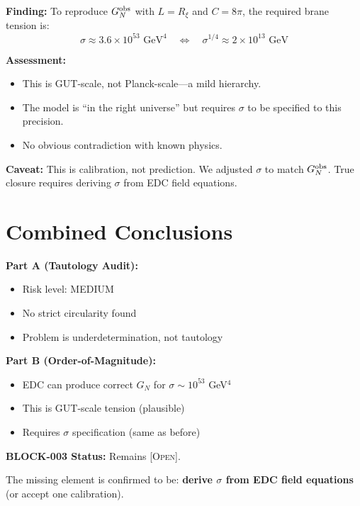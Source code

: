 \documentclass[11pt,a4paper]{article}
\newcommand{\Open}{\textsc{[Open]}}
\begin{document}
\begin{resultbox}
\textbf{Finding:} To reproduce $G_N^{\rm obs}$ with $L = R_\xi$ and $C = 8\pi$,
the required brane tension is:
\[
\sigma \approx 3.6 \times 10^{53} \text{ GeV}^4
\quad \Leftrightarrow \quad
\sigma^{1/4} \approx 2 \times 10^{13} \text{ GeV}
\]

\textbf{Assessment:}
\begin{itemize}
\item This is GUT-scale, not Planck-scale---a mild hierarchy.
\item The model is ``in the right universe'' but requires $\sigma$ to be
specified to this precision.
\item No obvious contradiction with known physics.
\end{itemize}

\textbf{Caveat:} This is calibration, not prediction. We adjusted $\sigma$
to match $G_N^{\rm obs}$. True closure requires deriving $\sigma$ from
EDC field equations.
\end{resultbox}

\section{Combined Conclusions}

\begin{auditbox}[Summary]
\textbf{Part A (Tautology Audit):}
\begin{itemize}
\item Risk level: MEDIUM
\item No strict circularity found
\item Problem is underdetermination, not tautology
\end{itemize}

\textbf{Part B (Order-of-Magnitude):}
\begin{itemize}
\item EDC can produce correct $G_N$ for $\sigma \sim 10^{53}$ GeV$^4$
\item This is GUT-scale tension (plausible)
\item Requires $\sigma$ specification (same as before)
\end{itemize}

\textbf{BLOCK-003 Status:} Remains \Open.

The missing element is confirmed to be: \textbf{derive $\sigma$ from EDC
field equations} (or accept one calibration).
\end{auditbox}
\end{document}
